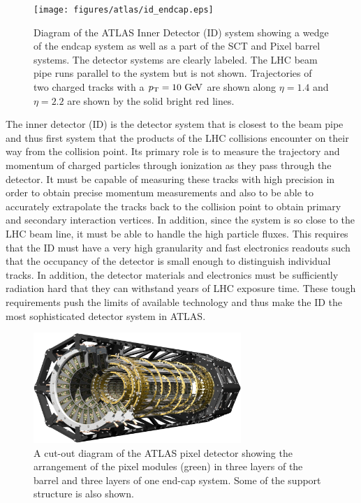 \begin{figure}[ht!]
\centering
\texttt{[image: figures/atlas/id\_endcap.eps]}
\caption{Diagram of the ATLAS Inner Detector (ID) system showing 
a wedge of the endcap system as well as a part of the SCT and Pixel
barrel systems.  The detector systems
are clearly labeled.  The LHC beam pipe runs parallel to the system
but is not shown. Trajectories of two charged tracks 
with a $\pt=10\GeV$ are shown along $\eta=1.4$ and $\eta=2.2$ are shown 
by the solid bright red lines.}
\label{fig:atlas_id_endcap}
\end{figure}

The inner detector (ID) is the 
detector system that is closest to the beam pipe and thus
first system that the products of the LHC collisions encounter
on their way from the collision point. Its primary role is 
to measure the trajectory and momentum of charged particles
through ionization as they pass through the detector.
It must be capable of measuring these tracks with high precision
in order to obtain precise momentum measurements and also to be able
to accurately extrapolate the tracks back to the collision point
to obtain primary and secondary interaction vertices. In addition,
since the system is so close to the LHC beam line, it
must be able to handle the high particle fluxes. This requires that
the ID must have a very high granularity and fast electronics
readouts such that the occupancy of the
detector is small enough to distinguish individual tracks. In addition,
the detector materials and electronics must be sufficiently radiation
hard that they can withstand years of LHC exposure time.
These tough requirements push the limits of available technology and thus
make the ID the most sophisticated detector system in ATLAS.



\begin{figure}[ht!]
\centering
\includegraphics[width=0.7\textwidth]{figures/atlas/pixel.eps}
\caption{A cut-out diagram of the ATLAS pixel detector showing 
the arrangement of the pixel modules (green) in three layers of the barrel
and three layers of one end-cap system. Some of the support structure is
also shown.}
\label{fig:atlas_pixel}
\end{figure}

